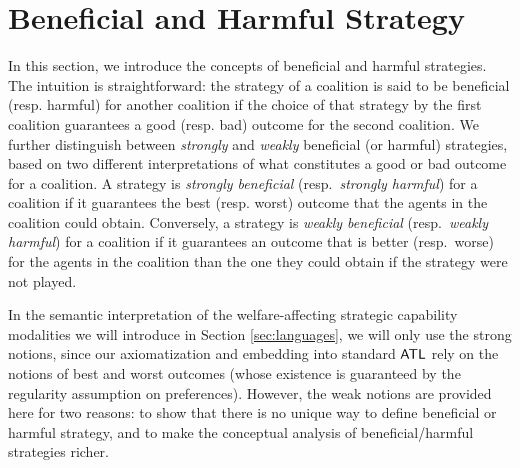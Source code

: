 \documentclass{article}
\begin{document}
 

 




 







\section{Beneficial  and Harmful Strategy }\label{sec:benharm}

In this section, we introduce the concepts of  beneficial  and  harmful  strategies. The intuition is straightforward: the strategy of a coalition is said to be beneficial (resp. harmful) for another coalition if the choice of that strategy by the first coalition guarantees a good (resp. bad) outcome for the second coalition. We further distinguish between \emph{strongly} and \emph{weakly} beneficial (or harmful) strategies, based on two different interpretations of what constitutes a good or bad outcome for a coalition.
A strategy is \emph{strongly beneficial} (resp.\ \emph{strongly harmful}) for a coalition if it guarantees the best (resp. worst) outcome that the agents in the coalition could obtain. Conversely, a strategy is \emph{weakly beneficial} (resp.\ \emph{weakly harmful}) for a coalition if it guarantees an outcome that is better (resp.\ worse) for the agents in the coalition than the one they could obtain if the strategy were not played.


In the semantic interpretation of the welfare-affecting strategic capability modalities we will introduce in Section \ref{sec:languages}, we will only use the strong notions, since our axiomatization and embedding into standard $\mathsf{ATL}$ rely on the notions of best and worst outcomes (whose existence is guaranteed by the regularity assumption on preferences). However, the weak notions are provided here for two reasons: to show that there is no unique way to define beneficial or harmful strategy, and to make the conceptual analysis of beneficial/harmful strategies richer. 
\end{document}
